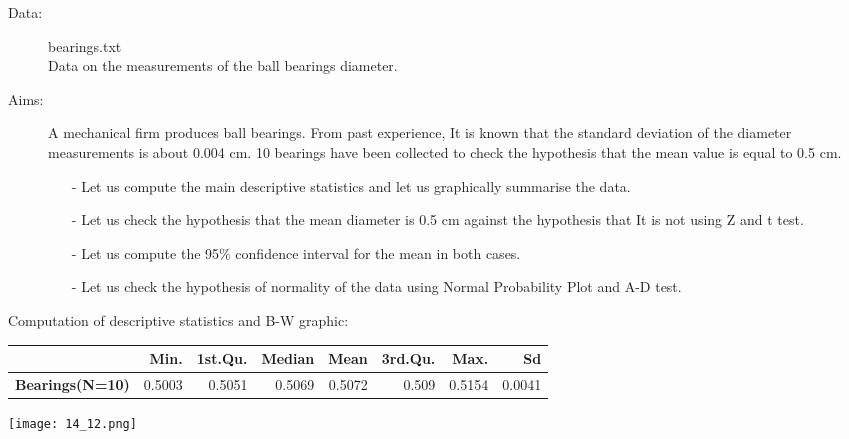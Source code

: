 \begin{frame} 
  \begin{description}
    \item[Data:] bearings.txt\\ 
      Data on the measurements of the ball bearings diameter.
    \item[Aims:]
      \begin{small}
        A mechanical firm produces ball bearings. From past experience, It is known that the standard deviation of the diameter measurements is about 0.004 cm. 10 bearings have been collected to check the hypothesis that the mean value is equal to 0.5 cm. 
        \begin{itemize}
          \item[-] Let us compute the main descriptive statistics and let us graphically summarise  the data.
          \item[-] Let us check the hypothesis that the mean diameter is 0.5 cm against the hypothesis that It is not using Z and t test.
          \item[-] Let us compute the 95\% confidence interval for the mean in both cases.
          \item[-] Let us check the hypothesis of normality of the data using Normal Probability Plot and A-D test. 
        \end{itemize}
      \end{small}
  \end{description}
\end{frame}

\begin{frame}
  Computation of descriptive statistics and B-W graphic:\\
  \vspace{.3cm}
  \begin{scriptsize}
    \begin{tabular}{|l|rrrrrrr|}
      \hline
      & \textbf{Min}. & 1\textbf{st.Qu}. & \textbf{Median} & \textbf{Mean} & \textbf{3rd.Qu.} & \textbf{Max.} & \textbf{Sd}\\
      \hline
      \textbf{Bearings(N=10)} & 0.5003 & 0.5051 & 0.5069 & 0.5072 & 0.509 & 0.5154 & 0.0041\\
      \hline	
    \end{tabular}
  \end{scriptsize}
  \begin{center}
    \texttt{[image: 14\_12.png]}
  \end{center}
\end{frame}

